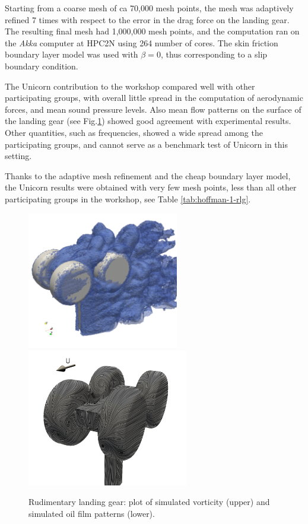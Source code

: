 Starting from a coarse mesh of ca 70,000 mesh points, the mesh was adaptively refined 7 times with respect to the error in the drag force on the landing gear. The resulting final mesh had 1,000,000 mesh points, and the computation ran on the \textit{Akka} computer at HPC2N using 264 number of cores. The skin friction boundary layer model was used with $\beta=0$, thus corresponding to a slip boundary condition.

The Unicorn contribution to the workshop compared well with other participating groups, with overall little spread in the computation of aerodynamic forces, and mean sound pressure levels. Also mean flow patterns on the surface of the landing gear (see Fig.\ref{rlg}) showed good agreement with experimental results. Other quantities, such as frequencies, showed a wide spread among the participating groups, and cannot serve as a benchmark test of Unicorn in this setting.

Thanks to the adaptive mesh refinement and the cheap boundary layer model, the Unicorn results were obtained with very few mesh points, less than all other participating groups in the workshop, see Table \ref{tab:hoffman-1-rlg}.

\begin{figure}
\centering
\includegraphics[height=6cm]{chapters/hoffman-1/png/rlg_vorticity}
\includegraphics[height=6cm]{chapters/hoffman-1/png/oilfilm_back_sim}
\caption{Rudimentary landing gear: plot of simulated vorticity (upper) and simulated oil film patterns (lower).}
\label{rlg}
\end{figure}


